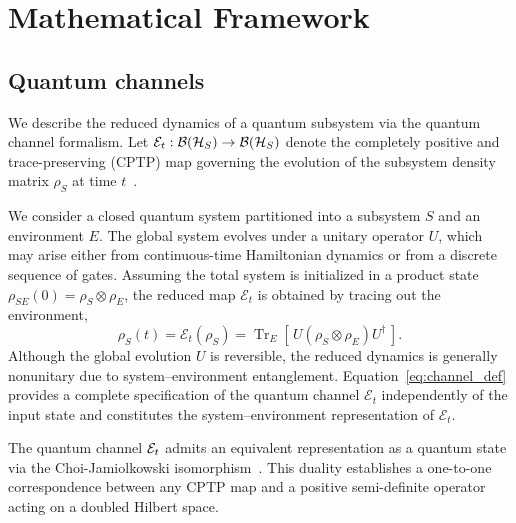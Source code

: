 \documentclass[pra,twocolumn,aps,showpacs,superscriptaddress,longbibliography]{revtex4-2}
\newcommand{\jami}{Choi-Jamiołkowski}
\begin{document}
\section{Mathematical Framework} \label{sec:formalism}

\subsection{Quantum channels}\label{sec:reduced_dynamics}

We describe the reduced dynamics of a quantum subsystem via the quantum channel formalism. Let $\mathcal{E}_t: \mathcal{B}(\mathcal{H}_S) \to \mathcal{B}(\mathcal{H}_S)$ denote the completely positive and trace-preserving (CPTP) map governing the evolution of the subsystem density matrix $\rho_S$ at time $t$~\cite{nielsen_2010_quantum,bengtsson_2006_geometry}.

We consider a closed quantum system partitioned into a subsystem $S$ and an environment $E$. The global system evolves under a unitary operator $U$, which may arise either from continuous-time Hamiltonian dynamics or from a discrete sequence of gates. Assuming the total system is initialized in a product state $\rho_{SE}(0)=\rho_S\otimes\rho_E$, the reduced map $\mathcal{E}_t$ is obtained by tracing out the environment,
\begin{equation}\label{eq:channel_def}
\rho_S(t)=\mathcal{E}_t(\rho_S)=\operatorname{Tr}_E\!\left[\,U(\rho_S\otimes\rho_E)U^\dagger\,\right].
\end{equation}
Although the global evolution $U$ is reversible, the reduced dynamics is generally nonunitary due to system–environment entanglement. Equation~\eqref{eq:channel_def} provides a complete specification of the quantum channel $\mathcal{E}_t$ independently of the input state and constitutes the system–environment representation of $\mathcal{E}_t$.

The quantum channel $\mathcal{E}_t$ admits an equivalent representation as a quantum state via the Choi-Jamiolkowski  isomorphism~\cite{jamiolkowski_1972_linear,choi_1975_completely}. This duality establishes a one-to-one correspondence between any CPTP map and a positive semi-definite operator acting on a doubled Hilbert space.
\end{document}
